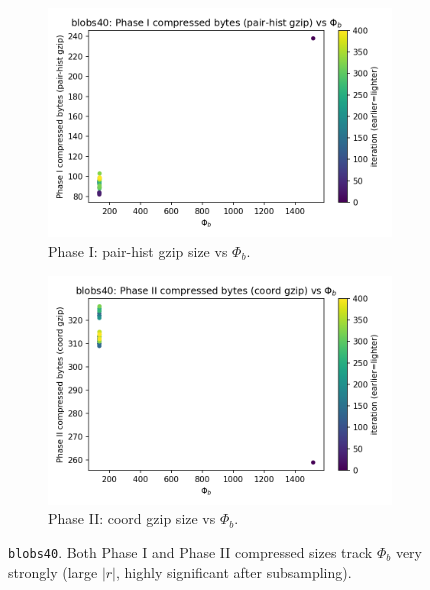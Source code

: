 \documentclass[11pt,a4paper]{article}
\numberwithin{equation}{section}
\newcommand{\phib}{\Phi_b}
\begin{document}
\begin{figure}[h!]
\centering
\begin{subfigure}[b]{0.48\textwidth}
\includegraphics[width=\textwidth]{figures/blobs40_phib_vs_phase1.png}
\caption{Phase I: pair-hist gzip size vs $\phib$.}
\end{subfigure}\hfill
\begin{subfigure}[b]{0.48\textwidth}
\includegraphics[width=\textwidth]{figures/blobs40_phib_vs_phase2.png}
\caption{Phase II: coord gzip size vs $\phib$.}
\end{subfigure}
\caption{\texttt{blobs40}. Both Phase I and Phase II compressed sizes track $\phib$ very strongly (large $|r|$, highly significant after subsampling).}
\label{fig:blobs40_corr}
\end{figure}
\end{document}
